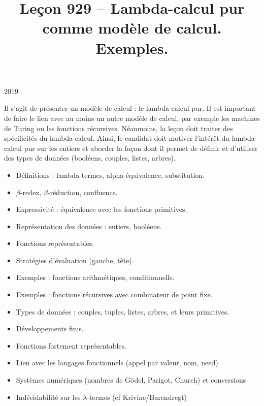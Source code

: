 \documentclass{agregfiche}
\title{Leçon 929 -- Lambda-calcul pur comme modèle de calcul. Exemples.}
\begin{document}
\maketitle

\secrapports

\begin{rapport}{2019}

Il s'agit de présenter un modèle de calcul : le lambda-calcul pur.
Il est important de faire le lien avec au moins un autre modèle de calcul, par exemple les machines de Turing ou les fonctions récursives.
Néanmoins, la leçon doit traiter des spécificités du lambda-calcul.
Ainsi, le candidat doit motiver l'intérêt du lambda-calcul pur sur les entiers et aborder la façon dont il permet de définir et d'utiliser des types de données (booléens, couples, listes, arbres).

\end{rapport}

\secindispensables

\begin{itemize}
    \item Définitions : lambda-termes, alpha-équivalence, substitution.
    \item $\beta$-redex, $\beta$-réduction, confluence.
   	\item Expressivité : équivalence avec les fonctions primitives.
\end{itemize}

\secasavoir

\begin{itemize}
	\item Représentation des données : entiers, booléens.
	\item Fonctions représentables.
  	\item Stratégies d'évaluation (gauche, tête).
	\item Exemples : fonctions arithmétiques, conditionnelle.
	\item Exemples : fonctions récursives avec combinateur de point
	fixe.
\end{itemize}

\secidees

\begin{itemize}
	\item Types de données : couples, tuples, listes, arbres, et leurs primitives.
	\item Développements finis.
	\item Fonctions fortement représentables.
	\item Lien avec les langages fonctionnels (appel par valeur, nom, need)
	\item Systèmes numériques (nombres de Gödel, Parigot, Church) et conversions
	\item Indécidabilité sur les $\lambda$-termes (cf Krivine/Barendregt)
\end{itemize}
\end{document}

